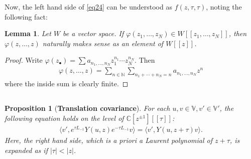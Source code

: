 \documentclass[12pt,a4paper,notitlepage]{article}
\theoremstyle{definition}
\theoremstyle{plain}
\newtheorem{pp}[df]{Proposition}
\newtheorem{lm}[df]{Lemma}
\newcommand{\bigbk}[1]{\big\langle {#1}\big\rangle}
\newcommand{\blt}{\bullet}
\newcommand{\Vbb}{\mathbb V}
\newcommand{\Cbb}{\mathbb C}
\newcommand{\Nbb}{\mathbb N}
\numberwithin{equation}{section}
\begin{document}
Now, the left hand side of \eqref{eq24} can be understood as $f(z,\tau,\tau)$, noting the following fact:
\begin{lm}
Let $W$ be a vector space. If $\varphi(z_1,\dots,z_N)\in W[[z_1,\dots,z_N]]$, then $\varphi(z,\dots,z)$ naturally makes sense as an element of $W[[z]]$.
\end{lm}
\begin{proof}
Write $\varphi(z_\blt)=\sum a_{n_1,\dots,n_N}z_1^{n_1}\cdots z_N^{n_N}$. Then
\begin{align*}
\varphi(z,\dots,z)=\sum_{n\in\Nbb} \sum_{n_1+\cdots+n_N=n}a_{n_1,\dots,n_N} z^n
\end{align*}
where the inside sum is clearly finite.
\end{proof}




\subsection{}





\begin{pp}[\textbf{Translation covariance}]\label{lb22}
For each $u,v\in\Vbb,v'\in\Vbb'$, the following equation holds on the level of $\Cbb[z^{\pm1}][[\tau]]$:
\begin{align}
\bigbk{v',e^{\tau L_{-1}}Y(u,z)e^{-\tau L_{-1}}v}=\bigbk{v',Y(u,z+\tau)v}.\label{eq26}	
\end{align}
Here, the right hand side, which is a priori a Laurent polynomial of $z+\tau$, is expanded as if $|\tau|<|z|$.
\end{pp}	
\end{document}
